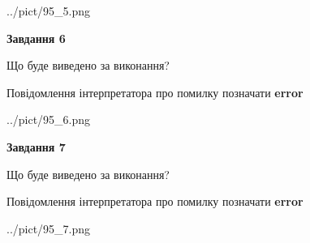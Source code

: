 \documentclass[10pt, ukrainian]{article}
\begin{document}
{\begin {large}
\begin{center}
	{../pict/95_5.png}
\end{center}
\newpage

{\begin {center}\textbf{Завдання 6}\end {center}}\par
Що буде виведено за виконання? \par
Повідомлення інтерпретатора про помилку позначати \textbf{error}

\begin{center}
	{../pict/95_6.png}
\end{center}
\newpage

{\begin {center}\textbf{Завдання 7}\end {center}}\par
Що буде виведено за виконання? \par
Повідомлення інтерпретатора про помилку позначати \textbf{error}

\begin{center}
	{../pict/95_7.png}
\end{center}
\newpage

\end {large}}
\end{document}
